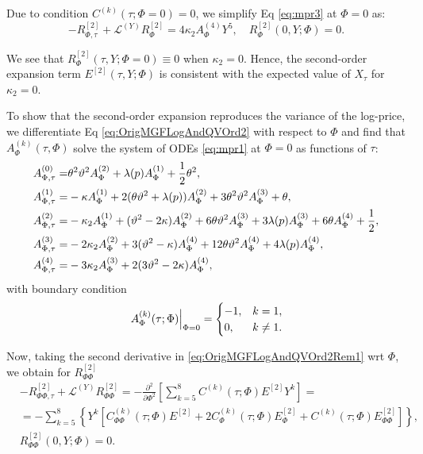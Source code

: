 \documentclass[pdftex,11pt,a4paper] {article}
\begin{document}
Due to condition $C^{(k)}(\tau; \Phi=0)= 0$, we simplify Eq \eqref{eq:mpr3} at $\Phi=0$ as:
\begin{equation}\label{eq:mpr4}
-R_{\Phi,\tau}^{[2]}+\mathcal{L}^{(Y)}R_{\Phi}^{[2]}=4\kappa_2 A_{\Phi}^{(4)}Y^5,\quad 
R_{\Phi}^{[2]}(0,Y;\Phi)=0.
\end{equation}

We see that $R_{\Phi}^{[2]}(\tau,Y;\Phi=0)\equiv 0$ when $\kappa_2=0$. Hence, the second-order expansion term $E^{[2]}(\tau,Y; \Phi)$ is consistent with the expected value of $X_{\tau}$ for $\kappa_2=0$. 


To show that the second-order expansion reproduces the variance of the log-price, we differentiate Eq \eqref{eq:OrigMGFLogAndQVOrd2} with respect to $\Phi$ and find that $A^{(k)}_{\Phi}(\tau,\Phi)$ solve the system of ODEs \eqref{eq:mpr1} at $\Phi=0$ as functions of $\tau$:
\begin{equation}\label{eq:mpr1}
\begin{split}
A^{(0)}_{\Phi, \tau}=&\theta^2\vartheta^2A_{\Phi}^{(2)}+\lambda(p) A_{\Phi}^{(1)}+\frac{1}{2}\theta^2,\\
A^{(1)}_{\Phi, \tau}=&-\kappa A_{\Phi}^{(1)} +2(\theta\vartheta^2+\lambda(p)) A_{\Phi}^{(2)}+3\theta^2\vartheta^2 A_{\Phi}^{(3)}+\theta,\\
A^{(2)}_{\Phi, \tau}=&-\kappa_2A_{\Phi}^{(1)}+(\vartheta^2-2\kappa)A_{\Phi}^{(2)}+6\theta\vartheta^2 A_{\Phi}^{(3)}+3\lambda(p) A_{\Phi}^{(3)}+6\theta A_{\Phi}^{(4)}+\frac{1}{2},\\
A^{(3)}_{\Phi, \tau}=&-2\kappa_2A_{\Phi}^{(2)}+3(\vartheta^2-\kappa)A_{\Phi}^{(4)}+12\theta\vartheta^2 A_{\Phi}^{(4)}+4\lambda(p) A_{\Phi}^{(4)},\\
A^{(4)}_{\Phi, \tau}=&-3\kappa_2A_{\Phi}^{(3)}+2(3\vartheta^2-2\kappa)A_{\Phi}^{(4)},\vspace*{-0.5\baselineskip}
\end{split}
\end{equation}
with boundary condition
\begin{equation}\label{eq:mpr_bc}
\left.A^{(k)}_{\Phi}(\tau; \Phi)\right|_{\Phi=0}=
\begin{cases}
-1, & k=1,\\
0, & k\neq 1.\vspace*{-0.5\baselineskip}
\end{cases}
\end{equation}

Now, taking the second derivative in \eqref{eq:OrigMGFLogAndQVOrd2Rem1} wrt $\Phi$, we obtain for $R_{\Phi\Phi}^{[2]}$
\begin{equation}\label{eq:mpr5}
\begin{split}
&-R_{\Phi\Phi,\tau}^{[2]}+\mathcal{L}^{(Y)}R_{\Phi\Phi}^{[2]}=
-\frac{\partial^2}{\partial\Phi^2}\left[\sum_{k=5}^8C^{(k)}(\tau;\Phi)E^{[2]}Y^k\right]=\\
&=-\sum_{k=5}^8\left\{Y^k\left[C_{\Phi\Phi}^{(k)}(\tau;\Phi)E^{[2]} + 2C_{\Phi}^{(k)}(\tau;\Phi)E_{\Phi}^{[2]} + C^{(k)}(\tau;\Phi)E_{\Phi\Phi}^{[2]}\right]\right\},\\
&R_{\Phi\Phi}^{[2]}(0,Y;\Phi)=0.
\end{split}
\end{equation}
\end{document}
